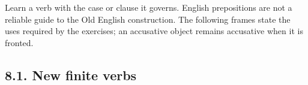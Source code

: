 Learn a verb with the case or clause it governs. English prepositions are not a reliable guide to the Old English construction. The following frames state the uses required by the exercises; an accusative object remains accusative when it is fronted.

\subsection*{8.1. New finite verbs}

